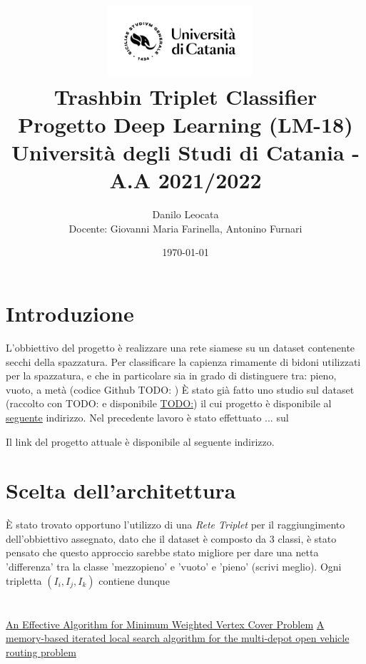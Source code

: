 \documentclass[11pt]{article}
\title{ %
\includegraphics[width=0.4\textwidth]{UniCT-Logo-Nero}~\\
Trashbin Triplet Classifier \\ 
\large Progetto Deep Learning (LM-18) \\ Università degli Studi di Catania - A.A 2021/2022 \\
}
\author{ Danilo Leocata \\ Docente: Giovanni Maria Farinella, Antonino Furnari}
\date{\today}
\begin{document}
\maketitle	
\pagebreak


\section{Introduzione}

L'obbiettivo del progetto è realizzare una rete siamese su un dataset contenente secchi della spazzatura.
Per classificare la capienza rimamente di bidoni utilizzati per la spazzatura, e che in particolare sia in grado di distinguere tra: pieno, vuoto, a metà (codice Github TODO: )
È stato già fatto uno studio sul dataset (raccolto con TODO: e disponibile \href{}{TODO:}) il cui progetto è disponibile al \href{https://github.com/khalld/trashbin-classifier}{seguente} indirizzo.
Nel precedente lavoro è stato effettuato ... sul 


Il link del progetto attuale è disponibile al seguente indirizzo.


\section{Scelta dell'architettura}

È stato trovato opportuno l'utilizzo di una \textit{Rete Triplet} per il raggiungimento dell'obbiettivo assegnato, dato che il dataset è composto da 3 classi, è stato pensato che questo approccio sarebbe stato migliore per dare una netta 'differenza' tra la classe 'mezzopieno' e 'vuoto' e 'pieno' (scrivi meglio).
Ogni tripletta $(I_i, I_j, I_k)$ contiene dunque


\section{}

\pagebreak

\begin{thebibliography}{5}


 \href{https://www.researchgate.net/publication/242463011_An_Effective_Algorithm_for_Minimum_Weighted_Vertex_Cover_problem}{An Effective Algorithm for Minimum Weighted Vertex Cover Problem}
 \href{https://www.sciencedirect.com/science/article/abs/pii/S0377221720300278}{A memory-based iterated local search algorithm for the multi-depot open vehicle routing problem}

\end{thebibliography}


\pagebreak
\end{document}

